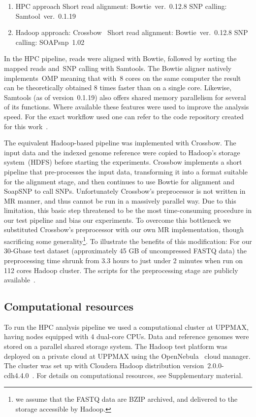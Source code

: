 \documentclass[11pt, oneside]{article}   	%
\begin{document}
\begin{enumerate}
\item HPC approach
\subitem Short read alignment: Bowtie~ver.~0.12.8
\subitem SNP calling: Samtool~ver.~0.1.19
\item Hadoop approach: Crossbow~\cite{crossbow}
\subitem Short read alignment: Bowtie~ver.~0.12.8
\subitem SNP calling: SOAPsnp~1.02~\cite{soapsnp}
\end{enumerate}


In the HPC pipeline, reads were aligned with Bowtie, followed by sorting the mapped reads and~SNP calling with Samtools. The Bowtie aligner natively implements~OMP meaning that with~8 cores on the same computer the result can be theoretically obtained 8 times faster than on a single core. Likewise, Samtools (as of version~0.1.19) also offers shared memory parallelism for several of its functions. Where available these features were used to improve the analysis speed. For the exact workflow used one can refer to the code repository created for this work~\cite{code_repo}.

The equivalent Hadoop-based pipeline was implemented with Crossbow. The input data and the indexed genome reference were copied to Hadoop's storage system~(HDFS) before starting the experiments. Crossbow implements a short pipeline that pre-processes the input data, transforming it into a format suitable for the alignment stage, and then continues to use Bowtie for alignment and SoapSNP to call SNPs.  Unfortunately Crossbow's preprocessor is not written in MR manner, and thus cannot be run in a massively parallel way. Due to this limitation, this basic step threatened to be the most time-consuming procedure in our test pipeline and bias our experiments. To overcome this bottleneck we substituted Crossbow's preprocessor with our own MR implementation, though sacrificing some generality\footnote{we assume that the FASTQ data are BZIP archived, and delivered to the storage accessible by Hadoop.}. To illustrate the benefits of this modification: For our 30-Gbase test dataset (approximately 45 GB of uncompressed FASTQ data) the preprocessing time shrunk from 3.3 hours to just under 2 minutes when run on 112 cores Hadoop cluster. The scripts for the preprocessing stage are publicly available~\cite{code_repo}.


\subsection{Computational resources}
To run the HPC analysis pipeline we used a computational cluster at UPPMAX, having nodes equipped with 4 dual-core CPUs. Data and reference genomes were stored on a parallel shared storage system. The Hadoop test platform was deployed on a private cloud at UPPMAX using the OpenNebula~\cite{opennebula} cloud manager. The cluster was set up with Cloudera Hadoop distribution version~2.0.0-cdh4.4.0~\cite{cloudera}. For details on computational resources, see Supplementary material.
\end{document}
